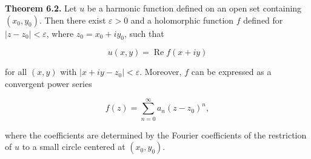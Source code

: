 \textbf{Theorem 6.2.} Let $u$ be a harmonic function defined on an open set containing $(x_0, y_0)$. Then there exist $\varepsilon > 0$ and a holomorphic function $f$ defined for $|z - z_0| < \varepsilon$, where $z_0 = x_0 + iy_0$, such that

$$u(x, y) = \operatorname{Re} f(x + iy)$$

for all $(x, y)$ with $|x + iy - z_0| < \varepsilon$. Moreover, $f$ can be expressed as a convergent power series

$$f(z) = \sum_{n=0}^{\infty} a_n (z - z_0)^n,$$

where the coefficients are determined by the Fourier coefficients of the restriction of $u$ to a small circle centered at $(x_0, y_0)$.

